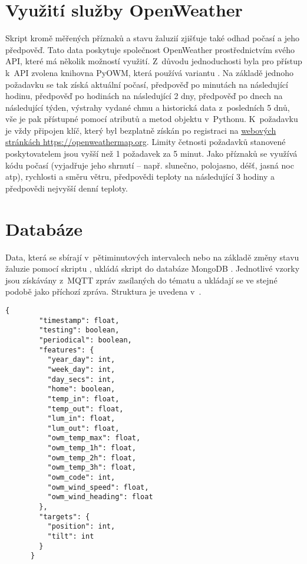   \section{Využití služby OpenWeather} \label{sec:owm}
    Skript  kromě měřených příznaků a stavu žaluzií zjišťuje také odhad počasí a jeho předpověď. Tato data poskytuje společnost OpenWeather prostřednictvím svého API, které má několik možností využití. Z~důvodu jednoduchosti byla pro přístup k~API zvolena knihovna PyOWM, která používá variantu . Na základě jednoho požadavku se tak získá aktuální počasí, předpověď po minutách na následující hodinu, předpověď po hodinách na následující 2 dny, předpověď po dnech na následující týden, výstrahy vydané \acrshort{chmu} a historická data z~posledních 5 dnů, vše je pak přístupné pomocí atributů a metod objektu v~Pythonu. K~požadavku je vždy připojen klíč, který byl bezplatně získán po registraci na \href{https://openweathermap.org}{webových stránkách https://openweathermap.org}. Limity četnosti požadavků stanovené poskytovatelem jsou vyšší než 1 požadavek za 5 minut. Jako příznaků se využívá kódu počasí (vyjadřuje jeho shrnutí -- např. slunečno, polojasno, déšť, jasná noc \acrshort{atp}), rychlosti a směru větru, předpovědi teploty na následující 3 hodiny a předpovědi nejvyšší denní teploty.

  \section{Databáze}\label{sec:db}
    Data, která se sbírají v~pětiminutových intervalech nebo na základě změny stavu žaluzie pomocí skriptu , ukládá skript  do databáze MongoDB \cite{mongodb:mongodb}. Jednotlivé vzorky jsou získávány z~MQTT zpráv zasílaných do tématu  a ukládají se ve stejné podobě jako příchozí zpráva. Struktura je uvedena v~.

    \begin{lstlisting}[caption={[Struktura vzorku v~databázi]Struktura vzorku dat uloženého jako záznam v~databázi MongoDB. Obsahuje hodnoty příznaků i stav žaluzií v~okamžiku jeho pořízení a časovou známku. Místo hodnot jsou zde uvedeny jejich datové typy (\code{float} - číslo s plovoucí řádovou čárkou, \code{boolean} - pravdivostní hodnota, \code{int} - celé číslo)},captionpos=b,label=lst:datum]
      {
        "timestamp": float,
        "testing": boolean,   
        "periodical": boolean,
        "features": {
          "year_day": int,
          "week_day": int,
          "day_secs": int,
          "home": boolean,
          "temp_in": float,
          "temp_out": float,
          "lum_in": float,
          "lum_out": float,
          "owm_temp_max": float,
          "owm_temp_1h": float,
          "owm_temp_2h": float,
          "owm_temp_3h": float,
          "owm_code": int,
          "owm_wind_speed": float,
          "owm_wind_heading": float
        },
        "targets": {
          "position": int,         
          "tilt": int
        }
      }
    \end{lstlisting}

